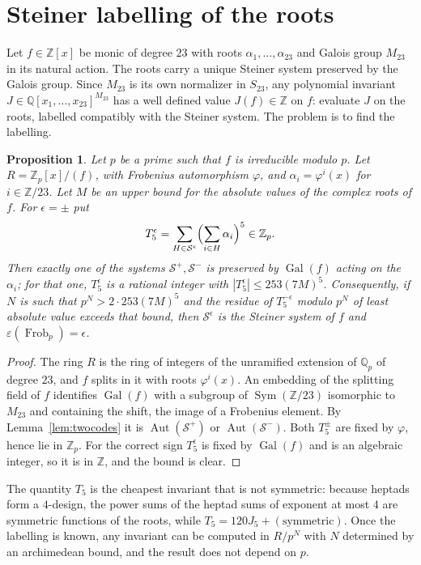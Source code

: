 \documentclass[11pt]{amsart}
\newtheorem{proposition}[theorem]{Proposition}
\theoremstyle{definition}
\newcommand{\QQ}{\mathbb{Q}}
\newcommand{\ZZ}{\mathbb{Z}}
\newcommand{\Gal}{\operatorname{Gal}}
\newcommand{\Aut}{\operatorname{Aut}}
\newcommand{\Frob}{\operatorname{Frob}}
\newcommand{\Sym}{\operatorname{Sym}}
\newcommand{\M}{M_{23}}
\newcommand{\cS}{\mathcal{S}}
\begin{document}


\section{Steiner labelling of the roots}\label{sec:labelling}

Let $f\in\ZZ[x]$ be monic of degree $23$ with roots $\alpha_1,\dots,\alpha_{23}$ and Galois group $\M$ in its natural action. The roots carry a unique Steiner system preserved by the Galois group. Since $\M$ is its own normalizer in $S_{23}$, any polynomial invariant $J\in\QQ[x_1,\dots,x_{23}]^{\M}$ has a well defined value $J(f)\in\ZZ$ on $f$: evaluate $J$ on the roots, labelled compatibly with the Steiner system. The problem is to find the labelling.

\begin{proposition}\label{prop:labelling}
Let $p$ be a prime such that $f$ is irreducible modulo $p$. Let $R=\ZZ_p[x]/(f)$, with Frobenius automorphism $\varphi$, and $\alpha_i=\varphi^i(x)$ for $i\in\ZZ/23$. Let $M$ be an upper bound for the absolute values of the complex roots of $f$. For $\epsilon=\pm$ put
\[
T_5^{\epsilon}=\sum_{H\in\cS^{\epsilon}}\Bigl(\sum_{i\in H}\alpha_i\Bigr)^{5}\in\ZZ_p .
\]
Then exactly one of the systems $\cS^+,\cS^-$ is preserved by $\Gal(f)$ acting on the $\alpha_i$; for that one, $T_5^\epsilon$ is a rational integer with $|T_5^\epsilon|\le253(7M)^5$. Consequently, if $N$ is such that $p^N>2\cdot253(7M)^5$ and the residue of $T_5^{-\epsilon}$ modulo $p^N$ of least absolute value exceeds that bound, then $\cS^{\epsilon}$ is the Steiner system of $f$ and $\varepsilon(\Frob_p)=\epsilon$.
\end{proposition}
\begin{proof}
The ring $R$ is the ring of integers of the unramified extension of $\QQ_p$ of degree $23$, and $f$ splits in it with roots $\varphi^i(x)$. An embedding of the splitting field of $f$ identifies $\Gal(f)$ with a subgroup of $\Sym(\ZZ/23)$ isomorphic to $\M$ and containing the shift, the image of a Frobenius element. By Lemma~\ref{lem:twocodes} it is $\Aut(\cS^+)$ or $\Aut(\cS^-)$. Both $T_5^\pm$ are fixed by $\varphi$, hence lie in $\ZZ_p$. For the correct sign $T_5^\epsilon$ is fixed by $\Gal(f)$ and is an algebraic integer, so it is in $\ZZ$, and the bound is clear.
\end{proof}

The quantity $T_5$ is the cheapest invariant that is not symmetric: because heptads form a $4$-design, the power sums of the heptad sums of exponent at most $4$ are symmetric functions of the roots, while $T_5=120J_5+(\text{symmetric})$. Once the labelling is known, any invariant can be computed in $R/p^N$ with $N$ determined by an archimedean bound, and the result does not depend on $p$.
\end{document}
